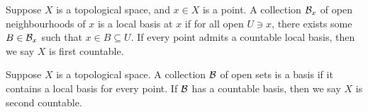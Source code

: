 \begin{definition}
    Suppose \(X\) is a topological space, and \(x \in X\) is a point.
    A collection \(\mathcal{B}_x\) of open neighbourhoods of \(x\) is a local basis at \(x\)
    if for all open \(U \ni x\), there exists some \(B \in \mathcal{B}_x\) such that \(x \in B \subseteq U\).
    If every point admits a countable local basis,
    then we say \(X\) is first countable.
\end{definition}
\begin{definition}
    Suppose \(X\) is a topological space.
    A collection \(\mathcal{B}\) of open sets is a basis if it contains a local basis for every point.
    If \(\mathcal{B}\) has a countable basis, then we say \(X\) is second countable.
\end{definition}

